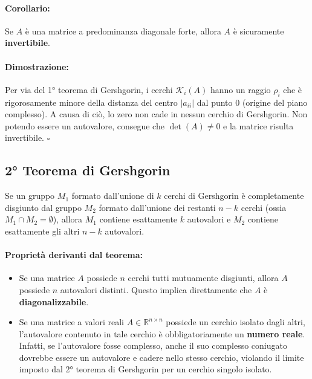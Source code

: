\documentclass[a4paper,12pt]{article}
\begin{document}
	\paragraph{Corollario:} Se $A$ è una matrice a predominanza diagonale forte, allora $A$ è sicuramente \textbf{invertibile}.
	
	\paragraph{Dimostrazione:} Per via del 1° teorema di Gershgorin, i cerchi $\mathcal{K}_i(A)$ hanno un raggio $\rho_i$ che è rigorosamente minore della distanza del centro $|a_{ii}|$ dal punto $0$ (origine del piano complesso). A causa di ciò, lo zero non cade in nessun cerchio di Gershgorin. Non potendo essere un autovalore, consegue che $\det(A) \neq 0$ e la matrice risulta invertibile. $\square$
	
	\subsection{2° Teorema di Gershgorin}
	\begin{tcolorbox}[title=2° Teorema di Gershgorin, colback=blue!5!white, colframe=blue!75!black]
		Se un gruppo $M_1$ formato dall'unione di $k$ cerchi di Gershgorin è completamente disgiunto dal gruppo $M_2$ formato dall'unione dei restanti $n-k$ cerchi (ossia $M_1 \cap M_2 = \emptyset$), allora $M_1$ contiene esattamente $k$ autovalori e $M_2$ contiene esattamente gli altri $n-k$ autovalori.
	\end{tcolorbox}
	
	\paragraph{Proprietà derivanti dal teorema:}
	\begin{itemize}
		\item Se una matrice $A$ possiede $n$ cerchi tutti mutuamente disgiunti, allora $A$ possiede $n$ autovalori distinti. Questo implica direttamente che $A$ è \textbf{diagonalizzabile}.
		\item Se una matrice a valori reali $A \in \mathbb{R}^{n \times n}$ possiede un cerchio isolato dagli altri, l'autovalore contenuto in tale cerchio è obbligatoriamente un \textbf{numero reale}. Infatti, se l'autovalore fosse complesso, anche il suo complesso coniugato dovrebbe essere un autovalore e cadere nello stesso cerchio, violando il limite imposto dal 2° teorema di Gershgorin per un cerchio singolo isolato.
	\end{itemize}
	
\end{document}
